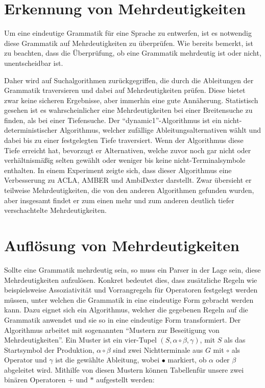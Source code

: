 \documentclass[runningheads]{llncs}
\begin{document}
    \newpage


    \section{Erkennung von Mehrdeutigkeiten}\label{sec:erkennung-von-mehrdeutigkeiten}

    Um eine eindeutige Grammatik für eine Sprache zu entwerfen,
    ist es notwendig diese Grammatik auf Mehrdeutigkeiten zu überprüfen.
    Wie bereits bemerkt, ist zu beachten, dass die Überprüfung, ob eine Grammatik mehrdeutig ist oder nicht,
    unentscheidbar ist\cite{hopcroft2006introduction}.

    Daher wird auf Suchalgorithmen zurückgegriffen, die durch die Ableitungen der Grammatik traversieren
    und dabei auf Mehrdeutigkeiten prüfen.
    Diese bietet zwar keine sicheren Ergebnisse, aber immerhin eine gute Annäherung.
    Statistisch gesehen ist es wahrscheinlicher eine Mehrdeutigkeiten bei einer Breitensuche zu finden,
    als bei einer Tiefensuche.
    Der ``dynamic1''-Algorithmus\cite{vasudevan2013detecting} ist ein nicht-deterministischer Algorithmus, welcher zufällige
    Ableitungsalternativen wählt und dabei bis zu einer festgelegten Tiefe traversiert.
    Wenn der Algorithmus diese Tiefe erreicht hat, bevorzugt er Alternativen, welche zuvor noch gar nicht oder
    verhältnismäßig selten gewählt oder weniger bis keine nicht-Terminalsymbole enthalten.
    In einem Experiment\cite{vasudevan2013detecting} zeigte sich,
    dass dieser Algorithmus eine Verbesserung zu ACLA, AMBER und AmbiDexter darstellt.
    Zwar übersieht er teilweise Mehrdeutigkeiten, die von den anderen Algorithmen gefunden wurden,
    aber insgesamt findet er zum einen mehr und zum anderen deutlich tiefer verschachtelte Mehrdeutigkeiten.


    \section{Auflösung von Mehrdeutigkeiten}\label{sec:auflosung-von-mehrdeutigkeiten}

    Sollte eine Grammatik mehrdeutig sein, so muss ein Parser in der Lage sein, diese Mehrdeutigkeiten aufzulösen.
    Konkret bedeutet dies, dass zusätzliche Regeln
    wie beispielsweise Assoziativität und Vorrangregeln für Operatoren festgelegt werden müssen,
    unter welchen die Grammatik in eine eindeutige Form gebracht werden kann\cite{vasudevan2013operator}.
    Dazu eignet sich ein Algorithmus\footnotemark[1], welcher die gegebenen Regeln auf die Grammatik anwendet
    und sie so in eine eindeutige Form transformiert.
    Der Algorithmus arbeitet mit sogenannten ``Mustern zur Beseitigung von Mehrdeutigkeiten''.
    Ein Muster ist ein vier-Tupel $(S, \alpha \circ \beta, \gamma)$, mit $S$ als das Startsymbol der Produktion,
    $\alpha \circ \beta$ sind zwei Nichtterminale aus $G$ mit $\circ$ als Operator und $\gamma$ ist die gewählte Ableitung,
    wobei $\bullet$ markiert, ob $\alpha$ oder $\beta$ abgeleitet wird.
    Mithilfe von diesen Mustern können Tabellen\footnotemark[2] für unsere zwei binären Operatoren $+$ und $*$ aufgestellt werden:
\end{document}
